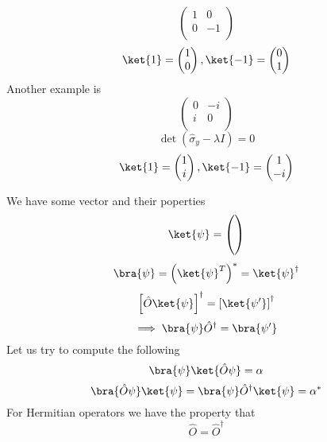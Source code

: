 \begin{eg}
    \[
        \begin{pmatrix}
            1 &0   \\
             0&-1   \\
        \end{pmatrix}
    \]
    \[
        \ket{1} = \begin{pmatrix}
             1 \\
             0 \\
        \end{pmatrix}, \ket{-1} = \begin{pmatrix}
             0 \\
              1\\
        \end{pmatrix}
    \]
    Another example is 
    \[
        \begin{pmatrix}
            0 &-i   \\
             i&  0 \\
        \end{pmatrix}
    \]
    \[
        \det \left(  \hat{\sigma} _y - \lambda I \right) = 0
    \]
    \[
        \ket{1} = \begin{pmatrix}
             1 \\
             i \\
        \end{pmatrix}, \ket{-1} = \begin{pmatrix}
             1 \\
             -i \\
        \end{pmatrix}
    \]
\end{eg}

\begin{definition}
    We have some vector and their poperties
    \[
        \ket{\psi } = \begin{pmatrix}
              \\
              \\
              \\
        \end{pmatrix}
    \]
    \[
        \bra{\psi} = \left( \ket{\psi }^T \right) ^* = \ket{\psi}^{\dagger}
    \]
    \[
        \left[ \hat{O}  \ket{\psi} \right] ^{\dagger} = \left[ \ket{\psi^{\prime} } \right]^{\dagger}
    \]
    \[
        \implies \bra{\psi} \hat{O} ^{\dagger} = \bra{\psi^{\prime} }
    \]
    Let us try to compute the following
    \[
        \bra{\psi }  \ket{\hat{O} \psi} = \alpha
    \]
    \[
        \bra{\hat{O} \psi } \ket{\psi } = \bra{\psi} \hat{O}^{\dagger} \ket{\psi } = \alpha^*
    \]   
    For Hermitian operators we have the property that 
    \[
        \hat{O}  = \hat{O} ^{\dagger}
    \]  
\end{definition}

